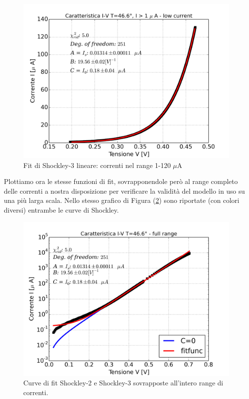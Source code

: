 \documentclass[10pt,letterpaper]{article}
\begin{document}
\begin{figure}
\centering
\includegraphics[width=0.9\linewidth]{./shockley_3_pars_46gradi}
\caption{Fit di Shockley-3 lineare: correnti nel range 1-120 $\mu$A}
\label{fig:shockley_3_pars_46gradi}
\end{figure}

Plottiamo ora le stesse funzioni di fit, sovrapponendole però al range completo delle correnti a nostra disposizione per verificare la validità del modello in uso su una più larga scala. Nello stesso grafico di Figura (\ref{fig:shockley_46_6_fullcur_visualiz}) sono riportate (con colori diversi) entrambe le curve di Shockley.

\begin{figure}
\centering
\includegraphics[width=0.9\linewidth]{./shockley_46_6_fullcur_visualiz}
\caption{Curve di fit Shockley-2 e Shockley-3 sovrapposte all'intero range di correnti.}
\label{fig:shockley_46_6_fullcur_visualiz}
\end{figure}
\end{document}
